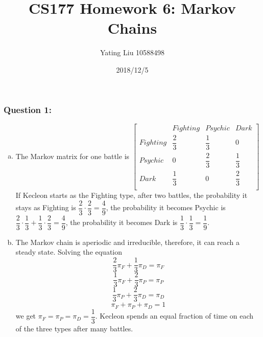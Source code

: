 \documentclass[12pt]{article}
\title{CS177 Homework 6: Markov Chains}
\author{Yating Liu 10588498}
\date{2018/12/5}
\begin{document}
\maketitle

\noindent

\subsubsection*{Question 1:} 
\begin{enumerate}[a)]
  \item 
  The Markov matrix for one battle is 
  $
  \begin{bmatrix}
    & Fighting & Psychic & Dark\\
  Fighting & \dfrac{2}{3} & \dfrac{1}{3} & 0\\
  Psychic & 0 & \dfrac{2}{3} & \dfrac{1}{3}\\
  Dark & \dfrac{1}{3} & 0 & \dfrac{2}{3}\\
  \end{bmatrix}
  $\\
  If Kecleon starts as the Fighting type, after two battles, the probability it stays as Fighting is $\dfrac{2}{3}\cdot\dfrac{2}{3}=\dfrac{4}{9}$, the probability it becomes Psychic is $\dfrac{2}{3}\cdot\dfrac{1}{3}+\dfrac{1}{3}\cdot\dfrac{2}{3}=\dfrac{4}{9}$, the probability it becomes Dark is $\dfrac{1}{3}\cdot\dfrac{1}{3}=\dfrac{1}{9}$. 
  
  \item 
  The Markov chain is aperiodic and irreducible, therefore, it can reach a steady state. Solving the equation
  \begin{equation}
  \dfrac{2}{3}\pi_F+\dfrac{1}{3}\pi_D=\pi_F
  \end{equation}  
  \begin{equation}
  \dfrac{1}{3}\pi_F+\dfrac{2}{3}\pi_P=\pi_P
  \end{equation}  
  \begin{equation}
  \dfrac{1}{3}\pi_P+\dfrac{2}{3}\pi_D=\pi_D
  \end{equation} 
  \begin{equation}
  \pi_F+\pi_P+\pi_D=1
  \end{equation} 
  we get $\pi_F=\pi_P=\pi_D=\dfrac{1}{3}$. Kecleon spends an equal fraction of time on each of the three types after many battles.
  

\end{enumerate}
\end{document}
